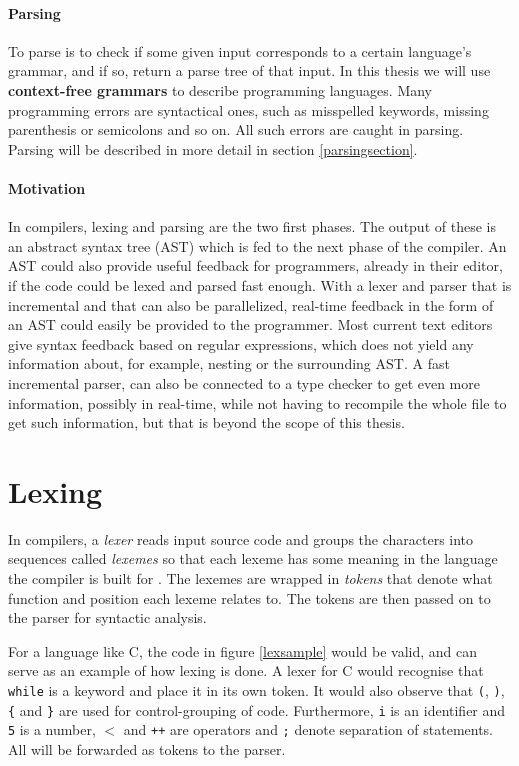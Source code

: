 \documentclass[a4paper,12pt,notitlepage]{report}
\renewcommand\cite{\citep}
\begin{document}
\paragraph{Parsing}
To parse is to check if some given input corresponds to a certain language's
grammar, and if so, return a parse tree of that input. In this thesis we will
use \textbf{context-free grammars} to describe programming languages. Many
programming errors are syntactical ones, such as misspelled keywords, missing
parenthesis or semicolons and so on. All such errors are caught in parsing.
Parsing will be described in more detail in section \ref{parsingsection}.

\paragraph{Motivation}
In compilers, lexing and parsing are the two first phases. The output of these
is an abstract syntax tree (AST) which is fed to the next phase of the compiler.
An AST could also provide useful feedback for programmers, already in their
editor, if the code could be lexed and parsed fast enough. With a lexer and
parser that is incremental and that can also be parallelized, real-time feedback
in the form of an AST could easily be provided to the programmer. Most current
text editors give syntax feedback based on regular expressions, which does not
yield any information about, for example, nesting or the surrounding AST. A
fast incremental parser, can also be connected to a type checker to get even
more information, possibly in real-time, while not having to recompile the whole
file to get such information, but that is beyond the scope of this thesis.

\section{Lexing}
In compilers, a \textit{lexer} reads input source code and groups the characters
into sequences called \textit{lexemes} so that each lexeme has some meaning in
the language the compiler is built for \cite[p. 5, p. 109]{dragonbook}. The
lexemes are wrapped in \textit{tokens} that denote what function and position
each lexeme relates to. The tokens are then passed on to the parser for
syntactic analysis.

For a language like C, the code in figure \ref{lexsample} would be valid, and
can serve as an example of how lexing is done.  A lexer for C would recognise
that \texttt{while} is a keyword and place it in its own token. It would also
observe that \texttt{(}, \texttt{)}, \texttt{\{} and \texttt{\}} are used for
control-grouping of code. Furthermore, \texttt{i} is an identifier and
\texttt{5} is a number, \texttt{$<$} and \texttt{++} are operators and
\texttt{;} denote separation of statements. All will be forwarded as tokens to
the parser.
\end{document}
